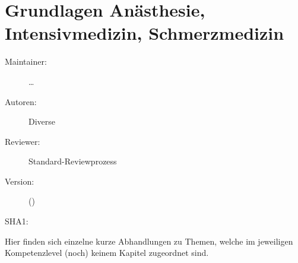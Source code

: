 \def\ChapterCode{AAIS}
\chapter
[\CO{[ADVANCED]} Grundlagen Anästhesie, Intensivmedizin, Schmerzmedizin]
{Grundlagen Anästhesie, Intensivmedizin, Schmerzmedizin}
\label{chp:AAIS}

\ChapterIntro
{%

}
{%
\begin{description}
  \item[Maintainer:] \ldots
  \item[Autoren:] Diverse
  \item[Reviewer:] Standard-Reviewprozess
  \item[Version:] {\VarDocVersionTypeName} ({\VarDocVersionTypeDescription})
  \item[SHA1:] {\DocGitCommit}
\end{description}

{\TxTeilkapitelAASS}}

{\sffamily\noindent Hier finden sich einzelne kurze
Abhandlungen zu Themen, welche im jeweiligen Kompetenzlevel
(noch) keinem Kapitel zugeordnet sind.}

\clearpage %

\section{}


\ChapterEnd










